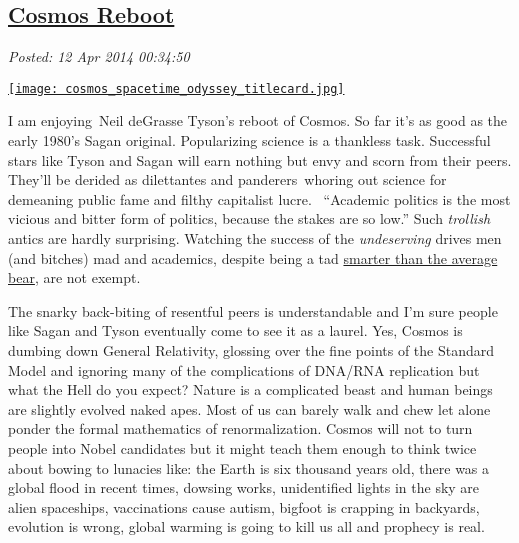 %

\subsection*{\href{http://bakerjd99.wordpress.com/2014/04/11/cosmos-reboot/}{Cosmos Reboot}}


\noindent\emph{Posted: 12 Apr 2014 00:34:50}
\vspace{6pt}

\captionsetup[floatingfigure]{labelformat=empty}
\begin{floatingfigure}[l]{0.25\textwidth}
\centering
\href{http://www.cosmosontv.com/}{\texttt{[image: cosmos\_spacetime\_odyssey\_titlecard.jpg]}}
\label{fig:4624X0}
\end{floatingfigure}I am enjoying~Neil deGrasse Tyson's reboot of Cosmos. So far it's as good
as the early 1980's Sagan original. Popularizing science is a thankless
task. Successful stars like Tyson and Sagan will earn nothing but envy
and scorn from their peers. They'll be derided as dilettantes and
panderers~whoring out science for demeaning public fame and filthy
capitalist lucre. ~``Academic politics is the most vicious and bitter
form of politics, because the stakes are so low.'' Such \emph{trollish}
antics are hardly surprising. Watching the success of the
\emph{undeserving} drives men (and bitches) mad and academics, despite
being a tad \href{https://www.youtube.com/watch?v=1pqyax6gwzQ}{smarter
than the average bear}, are not exempt.

The snarky back-biting of resentful peers is understandable and I'm sure
people like Sagan and Tyson eventually come to see it as a laurel. Yes,
Cosmos is dumbing down General Relativity, glossing over the fine points
of the Standard Model and ignoring many of the complications of DNA/RNA
replication but what the Hell do you expect? Nature is a complicated
beast and human beings are slightly evolved naked apes. Most of us can
barely walk and chew let alone ponder the formal mathematics of
renormalization. Cosmos will not to turn people into Nobel candidates
but it might teach them enough to think twice about bowing to lunacies
like: the Earth is six thousand years old, there was a global flood in
recent times, dowsing works, unidentified lights in the sky are alien
spaceships, vaccinations cause autism, bigfoot is crapping in backyards,
evolution is wrong, global warming is going to kill us all and prophecy
is real.

